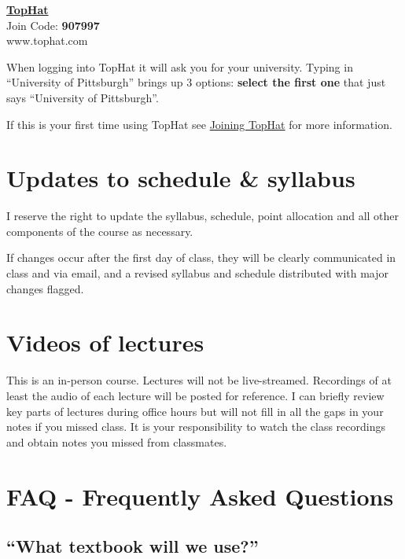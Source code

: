 \documentclass[
]{book}
\begin{document}
\href{www.tophat.com}{\textbf{TopHat}}\\
Join Code: \textbf{907997}\\
www.tophat.com

When logging into TopHat it will ask you for your university. Typing in ``University of Pittsburgh'' brings up 3 options: \textbf{select the first one} that just says ``University of Pittsburgh''.

If this is your first time using TopHat see \href{https://canvas.pitt.edu/courses/106737/pages/joining-tophat?module_item_id=2272350}{Joining TopHat} for more information.

\hypertarget{updates-to-schedule-syllabus}{%
\chapter{Updates to schedule \& syllabus}\label{updates-to-schedule-syllabus}}

I reserve the right to update the syllabus, schedule, point allocation and all other components of the course as necessary.

If changes occur after the first day of class, they will be clearly communicated in class and via email, and a revised syllabus and schedule distributed with major changes flagged.

\hypertarget{videos-of-lectures}{%
\chapter{Videos of lectures}\label{videos-of-lectures}}

This is an in-person course. Lectures will not be live-streamed. Recordings of at least the audio of each lecture will be posted for reference. I can briefly review key parts of lectures during office hours but will not fill in all the gaps in your notes if you missed class. It is your responsibility to watch the class recordings and obtain notes you missed from classmates.

\hypertarget{faq---frequently-asked-questions}{%
\chapter{FAQ - Frequently Asked Questions}\label{faq---frequently-asked-questions}}

\hypertarget{what-textbook-will-we-use}{%
\section{``What textbook will we use?''}\label{what-textbook-will-we-use}}
\end{document}
